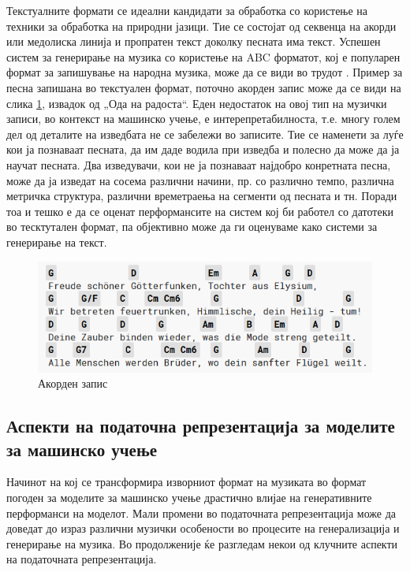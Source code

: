 Текстуалните формати се идеални кандидати за обработка со користење на техники за обработка на природни јазици. Тие се состојат од секвенца на акорди или медолиска линија и пропратен текст доколку песната има текст. Успешен систем за генерирање на музика со користење на ABC форматот, кој е популарен формат за запишување на народна музика, може да се види во трудот \cite{Sturm2015}. Пример за песна запишана во текстуален формат, поточно акорден запис може да се види на слика \ref{fig:akordi}, извадок од „Ода на радоста“. Еден недостаток на овој тип на музички записи, во контекст на машинско учење, е интерепретабилноста, т.е. многу голем дел од деталите на изведбата не се забележи во записите. Тие се наменети за луѓе кои ја познаваат песната, да им даде водила при изведба и полесно да може да ја научат песната. Два изведувачи, кои не ја познаваат најдобро конретната песна, може да ја изведат на сосема различни начини, пр. со различно темпо, различна метричка структура, различни времетраења на сегменти од песната и тн. Поради тоа и тешко е да се оценат перформансите на систем кој би работел со датотеки во тесктутален формат, па објективно може да ги оценуваме како системи за генерирање на текст.

\begin{figure}[H]
	\centering
\includegraphics[scale=0.9]{images/ode_to_joy.png}
	\caption{Акорден запис}
	\label{fig:akordi}
\end{figure}

\subsection{Аспекти на податочна репрезентација за моделите за машинско учење}

Начинот на кој се трансформира изворниот формат на музиката во формат погоден за моделите за машинско учење драстично влијае на генеративните перформанси на моделот. Мали промени во податочната репрезентација може да доведат до израз различни музички особености во процесите на генерализација и генерирање на музика. Во продолженије ќе разгледам некои од клучните аспекти на податочната репрезентација.

